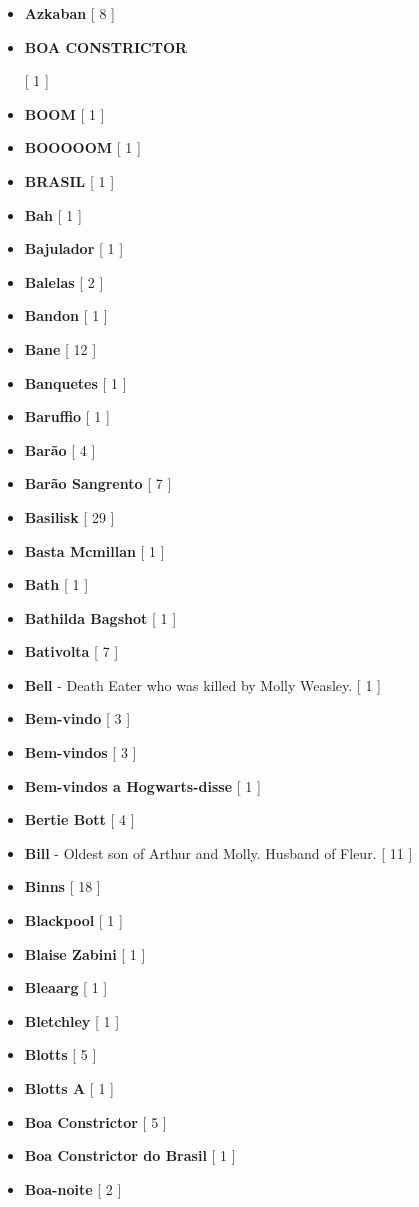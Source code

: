 \documentclass[a4paper]{article}
\begin{document}
\begin{itemize}
	\item \textbf{Azkaban} [ 8 ]
	\item \hypertarget{B}{\textbf{BOA CONSTRICTOR}} [ 1 ]
	\item \textbf{BOOM} [ 1 ]
	\item \textbf{BOOOOOM} [ 1 ]
	\item \textbf{BRASIL} [ 1 ]
	\item \textbf{Bah} [ 1 ]
	\item \textbf{Bajulador} [ 1 ]
	\item \textbf{Balelas} [ 2 ]
	\item \textbf{Bandon} [ 1 ]
	\item \textbf{Bane} [ 12 ]
	\item \textbf{Banquetes} [ 1 ]
	\item \textbf{Baruffio} [ 1 ]
	\item \textbf{Barão} [ 4 ]
	\item \textbf{Barão Sangrento} [ 7 ]
	\item \textbf{Basilisk} [ 29 ]
	\item \textbf{Basta Mcmillan} [ 1 ]
	\item \textbf{Bath} [ 1 ]
	\item \textbf{Bathilda Bagshot} [ 1 ]
	\item \textbf{Bativolta} [ 7 ]
	\item \textbf{Bell} - Death Eater who was killed by Molly Weasley. [ 1 ]
	\item \textbf{Bem-vindo} [ 3 ]
	\item \textbf{Bem-vindos} [ 3 ]
	\item \textbf{Bem-vindos a Hogwarts-disse} [ 1 ]
	\item \textbf{Bertie Bott} [ 4 ]
	\item \textbf{Bill} - Oldest son of Arthur and Molly. Husband of Fleur.  [ 11 ]
	\item \textbf{Binns} [ 18 ]
	\item \textbf{Blackpool} [ 1 ]
	\item \textbf{Blaise Zabini} [ 1 ]
	\item \textbf{Bleaarg} [ 1 ]
	\item \textbf{Bletchley} [ 1 ]
	\item \textbf{Blotts} [ 5 ]
	\item \textbf{Blotts A} [ 1 ]
	\item \textbf{Boa Constrictor} [ 5 ]
	\item \textbf{Boa Constrictor do Brasil} [ 1 ]
	\item \textbf{Boa-noite} [ 2 ]

\end{itemize}
\end{document}
